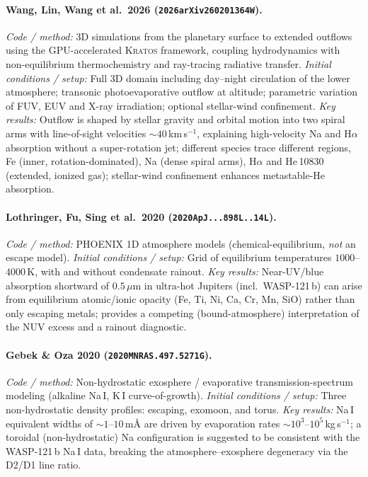 \paragraph{Wang, Lin, Wang et al.\ 2026 (\texttt{2026arXiv260201364W}).}
\textit{Code / method:} 3D simulations from the planetary surface to extended
outflows using the GPU-accelerated \textsc{Kratos} framework, coupling
hydrodynamics with non-equilibrium thermochemistry and ray-tracing radiative
transfer. \textit{Initial conditions / setup:} Full 3D domain including
day--night circulation of the lower atmosphere; transonic photoevaporative
outflow at altitude; parametric variation of FUV, EUV and X-ray irradiation;
optional stellar-wind confinement. \textit{Key results:} Outflow is shaped by
stellar gravity and orbital motion into two spiral arms with line-of-sight
velocities $\sim40$\,km\,s$^{-1}$, explaining high-velocity Na and H$\alpha$
absorption without a super-rotation jet; different species trace different
regions, Fe (inner, rotation-dominated), Na (dense spiral arms), H$\alpha$
and He\,10830 (extended, ionized gas); stellar-wind confinement enhances
metastable-He absorption.

\paragraph{Lothringer, Fu, Sing et al.\ 2020 (\texttt{2020ApJ...898L..14L}).}
\textit{Code / method:} PHOENIX 1D atmosphere models (chemical-equilibrium,
\emph{not} an escape model). \textit{Initial conditions / setup:} Grid of
equilibrium temperatures $1000$--$4000$\,K, with and without condensate
rainout. \textit{Key results:} Near-UV/blue absorption shortward of $0.5\,\mu$m
in ultra-hot Jupiters (incl.\ WASP-121\,b) can arise from equilibrium atomic/ionic
opacity (Fe, Ti, Ni, Ca, Cr, Mn, SiO) rather than only escaping metals; provides
a competing (bound-atmosphere) interpretation of the NUV excess and a rainout
diagnostic.

\paragraph{Gebek \& Oza 2020 (\texttt{2020MNRAS.497.5271G}).}
\textit{Code / method:} Non-hydrostatic exosphere / evaporative
transmission-spectrum modeling (alkaline Na\,I, K\,I curve-of-growth).
\textit{Initial conditions / setup:} Three non-hydrostatic density profiles:
escaping, exomoon, and torus. \textit{Key results:} Na\,I equivalent widths of
$\sim1$--$10$\,m\AA{} are driven by evaporation rates $\sim10^{3}$--$10^{5}$\,kg\,s$^{-1}$;
a toroidal (non-hydrostatic) Na configuration is suggested to be consistent with
the WASP-121\,b Na\,I data, breaking the atmosphere--exosphere degeneracy via the
D2/D1 line ratio.
